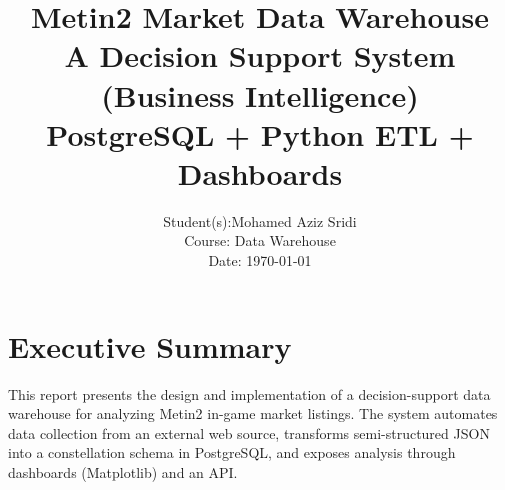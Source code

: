 \documentclass[12pt,a4paper]{report}
\title{\textbf{Metin2 Market Data Warehouse}\\\large A Decision Support System (Business Intelligence)\\[0.5em]\normalsize PostgreSQL + Python ETL + Dashboards}
\author{Student(s):Mohamed Aziz Sridi\\Course: Data Warehouse\\Date: \today}
\date{}
\begin{document}
\maketitle
\thispagestyle{empty}
\clearpage

\chapter*{Executive Summary}
This report presents the design and implementation of a decision-support data warehouse for analyzing Metin2 in-game market listings. 
The system automates data collection from an external web source, transforms semi-structured JSON into a constellation schema in PostgreSQL, and exposes analysis through dashboards (Matplotlib) and an API.
\clearpage

\tableofcontents
\listoffigures
\listoftables
\clearpage










\appendix

\end{document}
